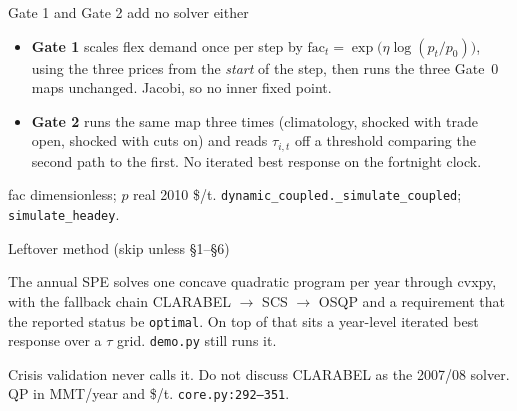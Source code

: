 \begin{frame}{Gate 1 and Gate 2 add no solver either}

\begin{itemize}
\item \textbf{Gate 1} scales flex demand once per step by
      $\mathrm{fac}_t=\exp\bigl(\eta\log(p_t/p_0)\bigr)$, using the
      three prices from the \emph{start} of the step, then runs the three
      Gate~0 maps unchanged. Jacobi, so no inner fixed point.
\item \textbf{Gate 2} runs the same map three times (climatology, shocked
      with trade open, shocked with cuts on) and reads $\tau_{i,t}$ off a
      threshold comparing the second path to the first. No iterated best
      response on the fortnight clock.
\end{itemize}
{fac dimensionless; $p$ real 2010 \$/t.}
{\texttt{dynamic\_coupled.\_simulate\_coupled}; \texttt{simulate\_headey}.}
\end{frame}

\begin{frame}{Leftover method (skip unless \S1--\S6)}

The annual SPE solves one concave quadratic program per year through
cvxpy, with the fallback chain CLARABEL $\to$ SCS $\to$ OSQP and a
requirement that the reported status be \texttt{optimal}. On top of that
sits a year-level iterated best response over a $\tau$ grid.
\texttt{demo.py} still runs it.

Crisis validation never calls it. Do not discuss CLARABEL as the 2007/08
solver.
\hyperlink{leftover}{}
{QP in MMT/year and \$/t.}
{\texttt{core.py:292--351}.}
\end{frame}
